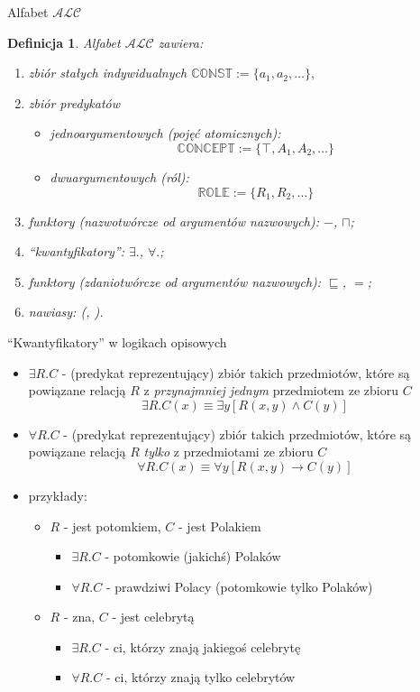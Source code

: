\documentclass{beamer}
\newtheorem{definicja}{Definicja}
\begin{document}
\begin{frame}{Alfabet $\mathcal{ALC}$}
%
\begin{definicja}
\label{alfabet (ALC)}
Alfabet $\mathcal{ALC}$ zawiera:%
\begin{enumerate}
\item zbiór stałych indywidualnych $\mathbb{CONST} := \{a_{1}, a_{2}, \dots\},$
%
\item zbiór predykatów %
\begin{itemize}
\item jednoargumentowych (\emph{pojęć atomicznych}):
$$\mathbb{CONCEPT} := \{\top, A_{1}, A_{2}, \dots\}$$%
\item dwuargumentowych (\emph{ról}):
$$\mathbb{ROLE} := \{R_{1}, R_{2}, \dots\}$$
\end{itemize}
%
\item funktory (nazwotwórcze od argumentów nazwowych): $-$, $\sqcap$;
%
\item ``kwantyfikatory'': $\exists .$, $\forall .$;
%
\item funktory (zdaniotwórcze od argumentów nazwowych): $\sqsubseteq$, $=$;
%
\item nawiasy: (, ).
\end{enumerate}
\end{definicja}
\end{frame}

\begin{frame}{``Kwantyfikatory'' w logikach opisowych}
%
\begin{itemize}
\item $\exists R . C$ - (predykat reprezentujący) zbiór takich przedmiotów, które są powiązane relacją $R$ z \emph{przynajmniej jednym} przedmiotem ze zbioru $C$
$$\exists R . C(x) \equiv \exists y [R(x, y) \land C(y)]$$
%
\item $\forall R . C$ - (predykat reprezentujący) zbiór takich przedmiotów, które są powiązane relacją $R$ \emph{tylko} z przedmiotami ze zbioru $C$
$$\forall R . C(x) \equiv \forall y [R(x, y) \to C(y)]$$
%
\item przykłady:
\begin{itemize}
\item $R$ - jest potomkiem, $C$ - jest Polakiem
\begin{itemize}
\item $\exists R . C$ - potomkowie (jakichś) Polaków
\item  $\forall R . C$ - prawdziwi Polacy (potomkowie tylko Polaków)
\end{itemize}
%
\item $R$ - zna, $C$ - jest celebrytą
\begin{itemize}
\item $\exists R . C$ - ci, którzy znają jakiegoś celebrytę
\item $\forall R . C$ - ci, którzy znają tylko celebrytów
\end{itemize}
\end{itemize}
\end{itemize}
\end{frame}
\end{document}
